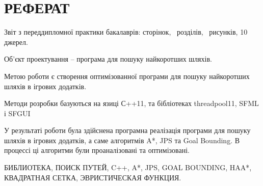 \section*{РЕФЕРАТ}

\vspace{1\baselineskip}

\thispagestyle{empty}

Звіт з переддипломної практики бакалаврів: \pageref{LastPage} сторінок, \totalsections\ розділів,  \totalfigures\ рисунків, 10 джерел.

Об'єкт проектування -- програма для пошуку найкоротших шляхів.

Метою роботи є створення оптимізованної програми для пошуку найкоротших шляхів в ігрових додатків.

Методи розробки базуються на язиці С++11, та бібліотеках threadpool11, SFML і SFGUI

У результаті роботи була здійснена програмна реалізація програми для пошуку шляхів в ігрових додатків, а саме алгоритмів A*, JPS та Goal Bounding. В процессі ці алгоритми були проаналізовані та оптимізовані.

БИБЛИОТЕКА, ПОИСК ПУТЕЙ, C++, A*, JPS, GOAL BOUNDING, HAA*, КВАДРАТНАЯ СЕТКА, ЭВРИСТИЧЕСКАЯ ФУНКЦИЯ.

%
%
%
%
%
%
